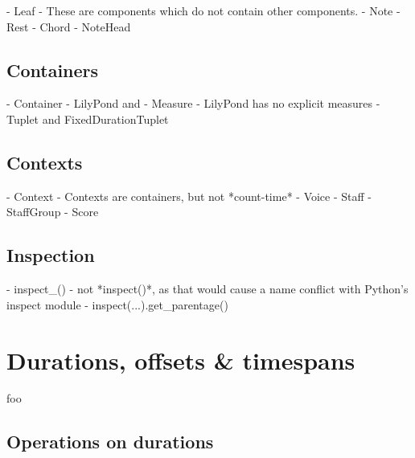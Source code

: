 \begin{markdown}
-   Leaf
-   These are components which do not contain other components.
-   Note
-   Rest
-   Chord
-   NoteHead
\end{markdown}

\subsection{Containers}

\begin{markdown}
-   Container
-   LilyPond and { }
-   Measure
-   LilyPond has no explicit measures
-   Tuplet and FixedDurationTuplet
\end{markdown}

\subsection{Contexts}

\begin{markdown}
-   Context
-   Contexts are containers, but not *count-time*
-   Voice
-   Staff
-   StaffGroup
-   Score
\end{markdown}

\subsection{Inspection}

\begin{markdown}
-   inspect_()
-   not *inspect()*, as that would cause a name conflict with Python's inspect
    module
-   inspect(...).get_parentage()
\end{markdown}

\begin{comment}
<abjad>
upper_staff = Staff(name='Upper Staff')
lower_staff = Staff(name='Lower Staff')
staff_group = StaffGroup([upper_staff, lower_staff])
score = Score([staff_group])
</abjad>
\end{comment}

\section{Durations, offsets \& timespans}

foo

\subsection{Operations on durations}

